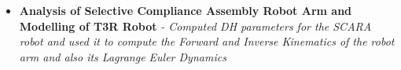 \documentclass{article}
\begin{document}
\begin{itemize}



    \item{\textbf{\large{Analysis of Selective Compliance Assembly Robot Arm and Modelling of T3R Robot}}}
          \newline
          \textit{- Computed DH parameters for the SCARA robot and used it to compute the Forward and Inverse Kinematics of the robot arm and also its Lagrange Euler Dynamics}


\end{itemize}



\end{document}
